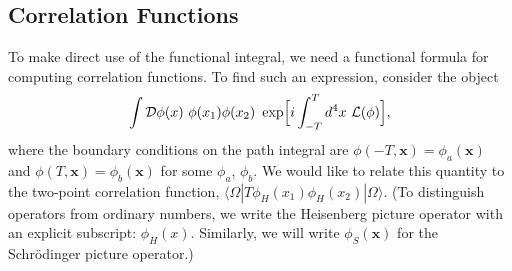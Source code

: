 \subsection{Correlation Functions}

To make direct use of the functional integral, we need a functional formula
for computing correlation functions.  To find such an expression, consider the
object
\begin{equation}
  \int \mathcal{D}\phi(x)\ \phi(x_1)\phi(x_2)\ \exp\Bigl[ i\int_{-T}^{T}
    d^4x\ \mathcal{L}(\phi) \Bigr],
  \label{eq:9.15}
\end{equation}
where the boundary conditions on the path integral are
$\phi(-T,\mathbf{x}) = \phi_a(\mathbf{x})$ and
$\phi(T,\mathbf{x}) = \phi_b(\mathbf{x})$ for some $\phi_a$, $\phi_b$.  We
would like to relate this quantity to the two-point correlation function,
$\langle\Omega|T\phi_H(x_1)\phi_H(x_2)|\Omega\rangle$.  (To distinguish
operators from ordinary numbers, we write the Heisenberg picture operator
with an explicit subscript: $\phi_H(x)$.  Similarly, we will write
$\phi_S(\mathbf{x})$ for the Schr\"odinger picture operator.)

